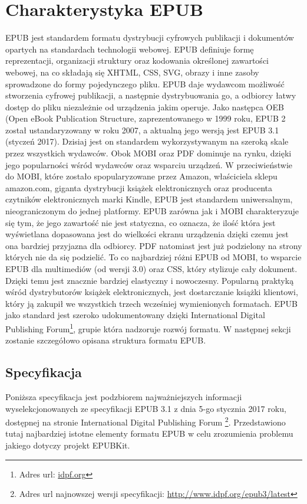 \chapter{Charakterystyka EPUB}

EPUB jest standardem formatu dystrybucji cyfrowych publikacji i dokumentów opartych na standardach technologii webowej. EPUB definiuje formę reprezentacji, organizacji struktury oraz kodowania określonej zawartości webowej, na co składają się XHTML, CSS, SVG, obrazy i inne zasoby sprowadzone do formy pojedynczego pliku. EPUB daje wydawcom możliwość stworzenia cyfrowej publikacji, a następnie dystrybuowania go, a odbiorcy łatwy dostęp do pliku niezależnie od urządzenia jakim operuje. Jako następca OEB (Open eBook Publication Structure, zaprezentowanego w 1999 roku, EPUB 2 został ustandaryzowany w roku 2007, a aktualną jego wersją jest EPUB 3.1 (styczeń 2017). Dzisiaj jest on standardem wykorzystywanym na szeroką skale przez wszystkich wydawców. Obok MOBI oraz PDF dominuje na rynku, dzięki jego popularności wśród wydawców oraz wsparciu urządzeń. W przeciwieństwie do MOBI, które zostało spopularyzowane przez Amazon, właściciela sklepu amazon.com, giganta dystrybucji książek elektronicznych oraz producenta czytników elektronicznych marki Kindle, EPUB jest standardem uniwersalnym, nieograniczonym do jednej platformy. EPUB zarówna jak i MOBI charakteryzuje się tym, że jego zawartość nie jest statyczna, co oznacza, że ilość która jest wyświetlana dopasowana jest do wielkości ekranu urządzenia dzięki czemu jest ona bardziej przyjazna dla odbiorcy. PDF natomiast jest już podzielony na strony których nie da się podzielić. To co najbardziej różni EPUB od MOBI, to wsparcie EPUB dla multimediów (od wersji 3.0) oraz CSS, który stylizuje cały dokument. Dzięki temu jest znacznie bardziej elastyczny i nowoczesny. Popularną praktyką wśród dystrybutorów książek elektronicznych, jest dostarczanie książki klientowi, który ją zakupił we wszystkich trzech wcześniej wymienionych formatach. EPUB jako standard jest szeroko udokumentowany dzięki International Digital Publishing Forum\footnote{Adres url: \href{idpf.org}{idpf.org}}, grupie która nadzoruje rozwój formatu. W następnej sekcji zostanie szczegółowo opisana struktura formatu EPUB.

\section{Specyfikacja}

Poniższa specyfikacja jest podzbiorem najważniejszych informacji wyselekcjonowanych ze specyfikacji EPUB 3.1 z dnia 5-go stycznia 2017 roku, dostępnej na stronie International Digital Publishing Forum \footnote{Adres url najnowszej wersji specyfikacji: \href{http://www.idpf.org/epub3/latest}{http://www.idpf.org/epub3/latest}}. Przedstawiono tutaj najbardziej istotne elementy formatu EPUB w celu zrozumienia problemu jakiego dotyczy projekt EPUBKit.

